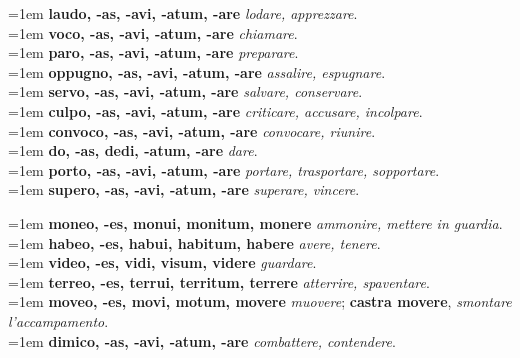 \documentclass[nols]{tufte-handout}
\begin{document}


\begin{multicols}{2}
    \noindent \hangindent=1em \textbf{laudo, -as, -avi, -atum, -are} \textit{lodare, apprezzare}.  \\
    \noindent \hangindent=1em \textbf{voco, -as, -avi, -atum, -are} \textit{chiamare}.  \\
    \noindent \hangindent=1em \textbf{paro, -as, -avi, -atum, -are} \textit{preparare}.  \\
    \noindent \hangindent=1em \textbf{oppugno, -as, -avi, -atum, -are} \textit{assalire, espugnare}.  \\
    \noindent \hangindent=1em \textbf{servo, -as, -avi, -atum, -are} \textit{salvare, conservare}.  \\
	\noindent \hangindent=1em \textbf{culpo, -as, -avi, -atum, -are} \textit{criticare, accusare, incolpare}.  \\
    \noindent \hangindent=1em \textbf{convoco, -as, -avi, -atum, -are} \textit{convocare, riunire}.  \\
    \noindent \hangindent=1em \textbf{do, -as, dedi, -atum, -are} \textit{dare}.  \\
    \noindent \hangindent=1em \textbf{porto, -as, -avi, -atum, -are} \textit{portare, trasportare, sopportare}.  \\
    \noindent \hangindent=1em \textbf{supero, -as, -avi, -atum, -are} \textit{superare, vincere}.  \\
    
\end{multicols}


\begin{multicols}{2}
    \noindent \hangindent=1em \textbf{moneo, -es, monui, monitum, monere} \textit{ammonire, mettere in guardia}.  \\
    \noindent \hangindent=1em \textbf{habeo, -es, habui, habitum, habere} \textit{avere, tenere}.  \\
    \noindent \hangindent=1em \textbf{video, -es, vidi, visum, videre} \textit{guardare}.  \\
    \noindent \hangindent=1em \textbf{terreo, -es, terrui, territum, terrere} \textit{atterrire, spaventare}.  \\
    \noindent \hangindent=1em \textbf{moveo, -es, movi, motum, movere} \textit{muovere}; \textbf{castra movere}, \textit{smontare l'accampamento}.  \\
    \noindent \hangindent=1em \textbf{dimico, -as, -avi, -atum, -are} \textit{combattere, contendere}.  \\
\end{multicols}
\end{document}
